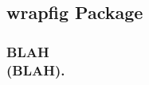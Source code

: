 \documentclass[class=book , crop=false]{standalone}
\title{}  %
\begin{document}


\subsection{wrapfig Package}
\medskip
\subsubsection{\Large BLAH \\\small(BLAH).}
\end{document}
